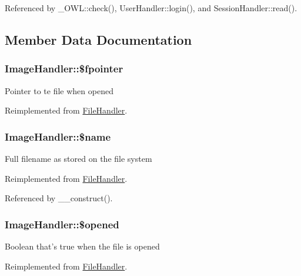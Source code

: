 Referenced by \_\-OWL::check(), UserHandler::login(), and SessionHandler::read().



\subsection{Member Data Documentation}
\subsubsection[{\$fpointer}]{\setlength{\rightskip}{0pt plus 5cm}ImageHandler::\$fpointer}\label{classImageHandler_ac56acda82f7ece75d33f6c57845a727e}
Pointer to te file when opened 

Reimplemented from \hyperlink{classFileHandler_aa0aa66fd3ad551b3f508b901a95c0c2d}{FileHandler}.

\subsubsection[{\$name}]{\setlength{\rightskip}{0pt plus 5cm}ImageHandler::\$name}\label{classImageHandler_a517b3d7ff8643cca1dc2080523bfe2d6}
Full filename as stored on the file system 

Reimplemented from \hyperlink{classFileHandler_a94903bd51b241928ed415ad271c38805}{FileHandler}.



Referenced by \_\-\_\-construct().

\subsubsection[{\$opened}]{\setlength{\rightskip}{0pt plus 5cm}ImageHandler::\$opened}\label{classImageHandler_a6a87b3626bd0a457c6937b3e9b1cc69b}
Boolean that's true when the file is opened 

Reimplemented from \hyperlink{classFileHandler_a061409b2bbd2e13bc47415527c0de720}{FileHandler}.

